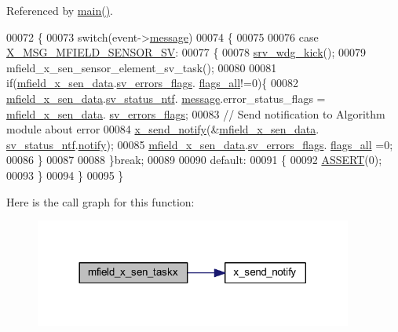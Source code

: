 Referenced by \hyperlink{a00048_source_l00080}{main()}.


\begin{DoxyCode}
00072 \{
00073     \textcolor{keywordflow}{switch}(event->\hyperlink{a00036_adf9665938515a20c283eea2c978cf80d}{message})
00074     \{
00075 
00076         \textcolor{keywordflow}{case} \hyperlink{a00025_a510020575747f82c587c5485b8619f78}{X\_MSG\_MFIELD\_SENSOR\_SV}:
00077         \{
00078             \hyperlink{a00067_a710d148845397582739d170341f3d3d9}{srv\_wdg\_kick}();
00079             mfield\_x\_sen\_sensor\_element\_sv\_task();
00080 
00081             \textcolor{keywordflow}{if}(\hyperlink{a00050_af8c531b1ba5fea148fb9111e06058f92}{mfield\_x\_sen\_data}.\hyperlink{a00025_aaeec6b0609dba31393f337abf1cce3d3}{sv\_errors\_flags}.
      \hyperlink{a00022_a1caa87b00c878186140c3bac9c8acf3b}{flags\_all}!=0)\{
00082              \hyperlink{a00050_af8c531b1ba5fea148fb9111e06058f92}{mfield\_x\_sen\_data}.\hyperlink{a00025_a752b00333ec308e07c6bd41aa9a01e73}{sv\_status\_ntf}.
      \hyperlink{a00019_a946af134546e64739ccfd37633480dc2}{message}.error\_status\_flags = \hyperlink{a00050_af8c531b1ba5fea148fb9111e06058f92}{mfield\_x\_sen\_data}.
      \hyperlink{a00025_aaeec6b0609dba31393f337abf1cce3d3}{sv\_errors\_flags};
00083              \textcolor{comment}{// Send notification to Algorithm module about error}
00084              \hyperlink{a00036_ae17b0bb16da3c471bb6074bb4c4d0fee}{x\_send\_notify}(&\hyperlink{a00050_af8c531b1ba5fea148fb9111e06058f92}{mfield\_x\_sen\_data}.
      \hyperlink{a00025_a752b00333ec308e07c6bd41aa9a01e73}{sv\_status\_ntf}.\hyperlink{a00019_a8e6a04c2283f9fd7b8dcbc62faba5847}{notify});
00085              \hyperlink{a00050_af8c531b1ba5fea148fb9111e06058f92}{mfield\_x\_sen\_data}.\hyperlink{a00025_aaeec6b0609dba31393f337abf1cce3d3}{sv\_errors\_flags}.
      \hyperlink{a00022_a1caa87b00c878186140c3bac9c8acf3b}{flags\_all} =0;
00086             \}
00087 
00088         \}\textcolor{keywordflow}{break};
00089 
00090         \textcolor{keywordflow}{default}:
00091         \{
00092             \hyperlink{a00072_abb8ff8e213ac9f6fb21d2b968583b936}{ASSERT}(0);
00093         \}
00094     \}
00095 \}
\end{DoxyCode}


Here is the call graph for this function\+:\nopagebreak
\begin{figure}[H]
\begin{center}
\leavevmode
\includegraphics[width=296pt]{dd/da2/a00019_a72e9235043dc4a8469143a6eb48bf117_cgraph}
\end{center}
\end{figure}




